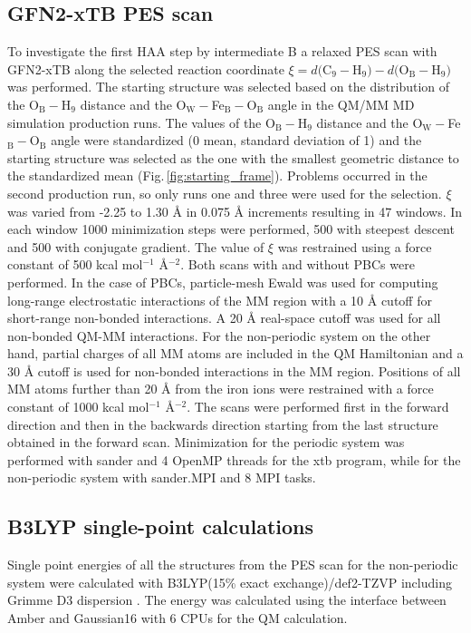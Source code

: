 \subsection{GFN2-xTB PES scan}
To investigate the first HAA step by intermediate B a relaxed PES scan with GFN2-xTB along the selected reaction coordinate $\xi = d($C$_{\text{9}}-$H$_9) - d($O$_{\text{B}}-$H$_9)$ was performed. The starting structure was selected based on the distribution of the O$_{\text{B}}-$H$_9$ distance and the O$_\text{W}-$Fe$_\text{B}-$O$_\text{B}$ angle in the QM/MM MD simulation production runs. The values of the O$_{\text{B}}-$H$_9$ distance and the O$_\text{W}-$Fe$_\text{B}-$O$_\text{B}$ angle were standardized (0 mean, standard deviation of 1) and the starting structure was selected as the one with the smallest geometric distance to the standardized mean (Fig.\,\ref{fig:starting_frame}). Problems occurred in the second production run, so only runs one and three were used for the selection. $\xi$ was varied from -2.25 to 1.30 Å in 0.075 Å increments resulting in 47 windows. In each window 1000 minimization steps were performed, 500 with steepest descent and 500 with conjugate gradient. The value of $\xi$ was restrained using a force constant of 500 kcal mol$^{-1}$ Å$^{-2}$. Both scans with and without PBCs were performed. In the case of PBCs, particle-mesh Ewald was used for computing long-range electrostatic interactions of the MM region with a 10 Å cutoff for short-range non-bonded interactions. A 20 Å real-space cutoff was used for all non-bonded QM-MM interactions. For the non-periodic system on the other hand, partial charges of all MM atoms are included in the QM Hamiltonian and a 30 Å cutoff is used for non-bonded interactions in the MM region. Positions of all MM atoms further than 20 Å from the iron ions were restrained with a force constant of 1000 kcal mol$^{-1}$ Å$^{-2}$. The scans were performed first in the forward direction and then in the backwards direction starting from the last structure obtained in the forward scan. Minimization for the periodic system was performed with sander and 4 OpenMP threads for the xtb program, while for the non-periodic system with sander.MPI and 8 MPI tasks.

\subsection{B3LYP single-point calculations}
Single point energies of all the structures from the PES scan for the non-periodic system were calculated with B3LYP(15\% exact exchange)/def2-TZVP including Grimme D3 dispersion \cite{Reiher2001,Weigend2005,Grimme2010}. The energy was calculated using the interface between Amber and Gaussian16 with 6 CPUs for the QM calculation.



